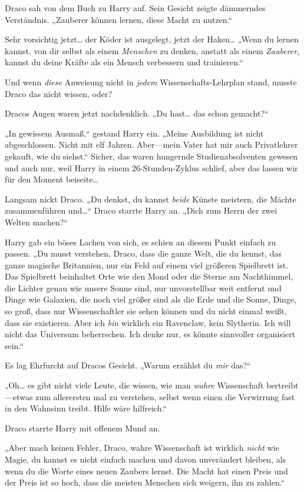 {Draco sah von dem Buch zu Harry auf. Sein Gesicht zeigte dämmerndes Verständnis. „Zauberer können lernen, diese Macht zu nutzen.“

Sehr vorsichtig jetzt… der Köder ist ausgelegt, jetzt der Haken… „Wenn du lernen kannst, von dir selbst als einem \emph{Menschen} zu denken, anstatt als einem \emph{Zauberer}, kannst du deine Kräfte als ein Mensch verbessern und trainieren.“

Und wenn \emph{diese} Anweisung nicht in \emph{jedem} Wissenschafts-Lehrplan stand, musste Draco das nicht wissen, oder?

Dracos Augen waren jetzt nachdenklich. „Du hast… das schon gemacht?“

„In gewissem Ausmaß,“ gestand Harry ein. „Meine Ausbildung ist nicht abgeschlossen. Nicht mit elf Jahren. Aber—mein Vater hat mir auch Privatlehrer gekauft, wie du siehst.“ Sicher, das waren hungernde Studienabsolventen gewesen und auch nur, weil Harry in einem 26-Stunden-Zyklus schlief, aber das lassen wir für den Moment beiseite…

Langsam nickt Draco. „Du denkst, du kannst \emph{beide} Künste meistern, die Mächte zusammenführen und…“ Draco starrte Harry an. „Dich zum Herrn der zwei Welten machen?“

Harry gab ein böses Lachen von sich, es schien an diesem Punkt einfach zu passen. „Du musst verstehen, Draco, dass die ganze Welt, die du kennst, das ganze magische Britannien, nur ein Feld auf einem viel größeren Spielbrett ist. Das Spielbrett beinhaltet Orte wie den Mond oder die Sterne am Nachthimmel, die Lichter genau wie unsere Sonne sind, nur unvorstellbar weit entfernt und Dinge wie Galaxien, die noch viel größer sind als die Erde und die Sonne, Dinge, so groß, dass nur Wissenschaftler sie sehen können und du nicht einmal weißt, dass sie existieren. Aber ich \emph{bin} wirklich ein Ravenclaw, kein Slytherin. Ich will nicht das Universum beherrschen. Ich denke nur, es könnte sinnvoller organisiert sein.“

Es lag Ehrfurcht auf Dracos Gesicht. „Warum erzählst du \emph{mir} das?“

„Oh… es gibt nicht viele Leute, die wissen, wie man \emph{wahre} Wissenschaft bertreibt—etwas zum allerersten mal zu verstehen, selbst wenn einen die Verwirrung fast in den Wahnsinn treibt. Hilfe wäre hilfreich.“

Draco starrte Harry mit offenem Mund an.

„Aber mach keinen Fehler, Draco, wahre Wissenschaft ist wirklich \emph{nicht} wie Magie, du kannst es nicht einfach machen und davon unverändert bleiben, als wenn du die Worte eines neuen Zaubers lernst. Die Macht hat einen Preis und der Preis ist so hoch, dass die meisten Menschen sich weigern, ihn zu zahlen.“

}
